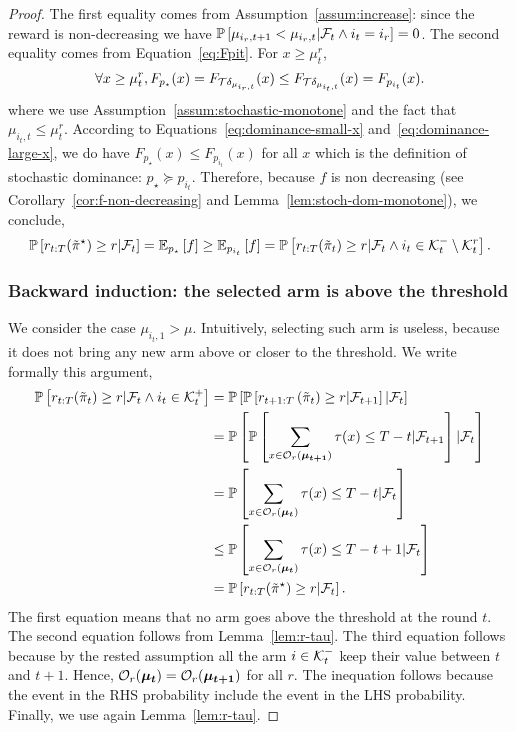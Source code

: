 \begin{proof}
The first equality comes from Assumption~\ref{assum:increase}: since the reward is non-decreasing we have  $\mathbb{P}\left[\mu_{i_r, t+1} < \mu_{i_r,t} | \mathcal{F}_t \land i_t =i_r\right] =0 $. The second equality comes from Equation~\ref{eq:Fpit}. For $x \geq \mu^r_{t}$, 
\begin{equation}
\label{eq:dominance-large-x}
\forall x \geq \mu^r_{t}, F_{p_{\star}}(x) = F_{\mathcal{T}\delta_{\mu_{i_r,t}}}(x) \leq F_{\mathcal{T}\delta_{\mu_{i_t,t}}}(x) =  F_{p_{i_t}}(x).
\end{equation}
where we use Assumption~\ref{assum:stochastic-monotone} and the fact that $\mu_{i_t,t} \leq \mu^r_{t}$. According to Equations~\ref{eq:dominance-small-x} and~\ref{eq:dominance-large-x}, we do have $F_{p_\star}(x) \leq  F_{p_{i_t}}(x)$ for all $x$ which is the definition of stochastic dominance: $p_\star \succeq  p_{i_t}$. Therefore, because $f$ is non decreasing (see Corollary~\ref{cor:f-non-decreasing} and Lemma~\ref{lem:stoch-dom-monotone}), we conclude,
\begin{equation}
    \mathbb{P}\left[r_{t:T}(\Tilde{\pi}^\star) \geq r| \mathcal{F}_t\right] = \mathbb{E}_{p_\star}\left[f\right] \geq \mathbb{E}_{p_{i_t}}\left[f\right] = \mathbb{P}\left[r_{t:T}(\Tilde{\pi}_t) \geq r| \mathcal{F}_t \land i_t\in \mathcal{K}_t^- \setminus \mathcal{K}_t^r \right].
    \label{eq:muitt-low}
\end{equation}

\subsubsection{Backward induction: the selected arm is above the threshold}
We consider the case $\mu_{i_t,1} > \mu$. Intuitively, selecting such arm is useless, because it does not bring any new arm above or closer to the threshold. We write formally this argument,
\begin{align}
    \mathbb{P}\left[r_{t:T}(\Tilde{\pi}_{t}) \geq r| \mathcal{F}_t \land i_t \in \mathcal{K}_t^+\right] &= \mathbb{P}\left[\mathbb{P}\left[r_{t+1: T}\left(\Tilde{\pi}_{t}\right) \geq r | \mathcal{F}_{t+1}\right]|\mathcal{F}_t\right] \nonumber\\
    &=\mathbb{P}\left[\mathbb{P}\left[\sum_{x \in \mathcal{O}_r(\boldsymbol{\mu}_{\boldsymbol{t+1}})} \tau(x) \leq T-t | \mathcal{F}_{t+1}\right]|\mathcal{F}_t\right]\nonumber\\
    &=\mathbb{P}\left[\sum_{x \in \mathcal{O}_r(\boldsymbol{\mu_t})} \tau(x) \leq T-t | \mathcal{F}_t\right]\nonumber\\
    &\leq  \mathbb{P}\left[\sum_{x \in \mathcal{O}_r(\boldsymbol{\mu_t})} \tau(x) \leq T-t+1 | \mathcal{F}_t\right]\nonumber \\
    &=    \mathbb{P}\left[r_{t:T}(\Tilde{\pi}^\star) \geq r| \mathcal{F}_t \right] .
    \label{eq:muitt-high}
\end{align}
The first equation means that no arm goes above the threshold at the round $t$. The second equation follows from Lemma~\ref{lem:r-tau}. The third equation follows because by the rested assumption all the arm $i \in \mathcal{K}_t^-$ keep their value between $t$ and $t+1$. Hence, $\mathcal{O}_r(\boldsymbol{\mu_t}) = \mathcal{O}_r(\boldsymbol{\mu}_{\boldsymbol{t+1}})$ for all $r$. The inequation follows because the event in the RHS probability include the event in the LHS probability. Finally, we use again Lemma~\ref{lem:r-tau}.

\end{proof}
